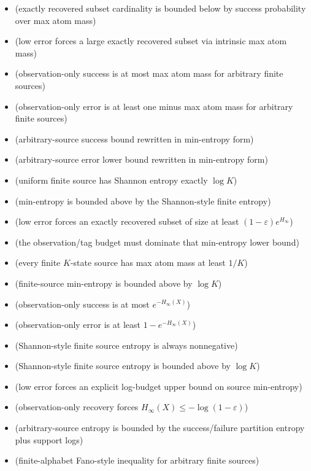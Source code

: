 \begin{itemize}
\item {} (exactly recovered subset cardinality is bounded below by success probability over max atom mass)
\item {} (low error forces a large exactly recovered subset via intrinsic max atom mass)
\item {} (observation-only success is at most max atom mass for arbitrary finite sources)
\item {} (observation-only error is at least one minus max atom mass for arbitrary finite sources)
\item {} (arbitrary-source success bound rewritten in min-entropy form)
\item {} (arbitrary-source error lower bound rewritten in min-entropy form)
\item {} (uniform finite source has Shannon entropy exactly $\log K$)
\item {} (min-entropy is bounded above by the Shannon-style finite entropy)
\item {} (low error forces an exactly recovered subset of size at least $(1-\varepsilon)e^{H_{\infty}}$)
\item {} (the observation/tag budget must dominate that min-entropy lower bound)
\item {} (every finite $K$-state source has max atom mass at least $1/K$)
\item {} (finite-source min-entropy is bounded above by $\log K$)
\item {} (observation-only success is at most $e^{-H_{\infty}(X)}$)
\item {} (observation-only error is at least $1-e^{-H_{\infty}(X)}$)
\item {} (Shannon-style finite source entropy is always nonnegative)
\item {} (Shannon-style finite source entropy is bounded above by $\log K$)
\item {} (low error forces an explicit log-budget upper bound on source min-entropy)
\item {} (observation-only recovery forces $H_{\infty}(X) \le -\log(1-\varepsilon)$)
\item {} (arbitrary-source entropy is bounded by the success/failure partition entropy plus support logs)
\item {} (finite-alphabet Fano-style inequality for arbitrary finite sources)

\end{itemize}
